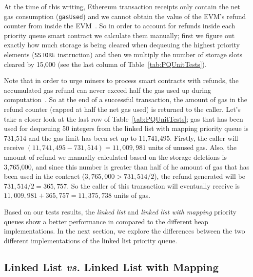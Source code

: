 At the time of this writing, Ethereum transaction receipts only contain the net gas consumption (\texttt{gasUsed}) and we cannot obtain the value of the EVM's refund counter from inside the EVM~\cite{signer2018gas}. So in order to account for refunds inside each priority queue smart contract we calculate them manually; first we figure out exactly how much storage is being cleared when dequeuing the highest priority elements (\texttt{SSTORE} instruction) and then we multiply the number of storage slots cleared by 15,000 (see the last column of Table~\ref{tab:PQUnitTests}).

Note that in order to urge miners to process smart contracts with refunds, the accumulated gas refund can never exceed half the gas used up during computation~\cite{wood2014ethereum}. So at the end of a successful transaction, the amount of gas in the refund counter (capped at half the net gas used) is returned to the caller. Let's take a closer look at the last row of Table~\ref{tab:PQUnitTests}; gas that has been used for dequeuing 50 integers from the linked list with mapping priority queue is 731,514 and the gas limit has been set up to 11,741,495. Firstly, the caller will receive $(11,741,495 - 731,514) = 11,009,981$ units of unused gas. Also, the amount of refund we manually calculated based on the storage deletions is 3,765,000, and since this number is greater than half of he amount of gas that has been used in the contract ($3,765,000 > 731,514/2$), the refund generated will be $731,514/2 = 365,757$. So the caller of this transaction will eventually receive is $11,009,981 + 365,757 = 11,375,738$ units of gas.




Based on our tests results, the \textit{linked list} and \textit{linked list with mapping} priority queues show a better performance in compared to the different heap implementations. In the next section, we explore the differences between the two different implementations of the linked list priority queue.



\subsection{Linked List \textit{vs.} Linked List with Mapping}\label{sec:LLvsLLMapping}

